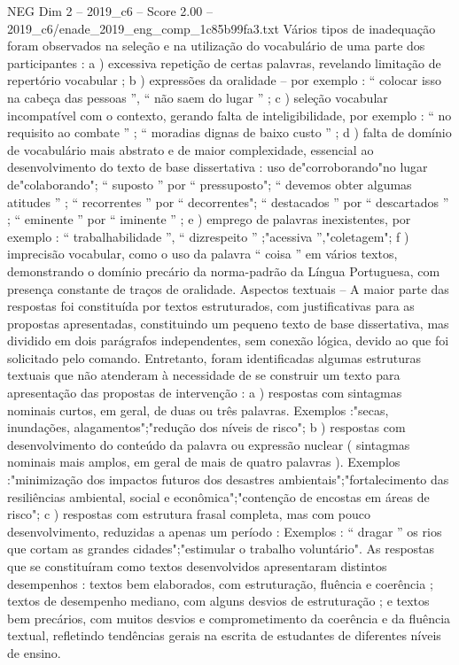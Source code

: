 \begin{textsample}{NEG Dim 2 – 2019\_c6 – Score 2.00 – 2019\_c6/enade\_2019\_eng\_comp\_1c85b99fa3.txt}
Vários tipos de inadequação foram observados na seleção e na utilização do vocabulário de uma parte dos participantes : a ) excessiva repetição de certas palavras, revelando limitação de repertório vocabular ; b ) expressões da oralidade – por exemplo : “ colocar isso na cabeça das pessoas ”, “ não saem do lugar ” ; c ) seleção vocabular incompatível com o contexto, gerando falta de inteligibilidade, por exemplo : “ no requisito ao combate ” ; “ moradias dignas de baixo custo ” ; d ) falta de domínio de vocabulário mais abstrato e de maior complexidade, essencial ao desenvolvimento do texto de base dissertativa : uso de"corroborando"no lugar de"colaborando"; “ suposto ” por “ pressuposto"; “ devemos obter algumas atitudes ” ; “ recorrentes ” por “ decorrentes"; “ destacados ” por “ descartados ” ; “ eminente ” por “ iminente ” ; e ) emprego de palavras inexistentes, por exemplo : “ trabalhabilidade ”, “ dizrespeito ” ;"acessiva ”,"coletagem"; f ) imprecisão vocabular, como o uso da palavra “ coisa ” em vários textos, demonstrando o domínio precário da norma-padrão da Língua Portuguesa, com presença constante de traços de oralidade.
Aspectos textuais – A maior parte das respostas foi constituída por textos estruturados, com justificativas para as propostas apresentadas, constituindo um pequeno texto de base dissertativa, mas dividido em dois parágrafos independentes, sem conexão lógica, devido ao que foi solicitado pelo comando.
Entretanto, foram identificadas algumas estruturas textuais que não atenderam à necessidade de se construir um texto para apresentação das propostas de intervenção : a ) respostas com sintagmas nominais curtos, em geral, de duas ou três palavras.
Exemplos :"secas, inundações, alagamentos";"redução dos níveis de risco"; b ) respostas com desenvolvimento do conteúdo da palavra ou expressão nuclear ( sintagmas nominais mais amplos, em geral de mais de quatro palavras ).
Exemplos :"minimização dos impactos futuros dos desastres ambientais";"fortalecimento das resiliências ambiental, social e econômica";"contenção de encostas em áreas de risco"; c ) respostas com estrutura frasal completa, mas com pouco desenvolvimento, reduzidas a apenas um período : Exemplos : “ dragar ” os rios que cortam as grandes cidades";"estimular o trabalho voluntário".
As respostas que se constituíram como textos desenvolvidos apresentaram distintos desempenhos : textos bem elaborados, com estruturação, fluência e coerência ; textos de desempenho mediano, com alguns desvios de estruturação ; e textos bem precários, com muitos desvios e comprometimento da coerência e da fluência textual, refletindo tendências gerais na escrita de estudantes de diferentes níveis de ensino.

\end{textsample}
